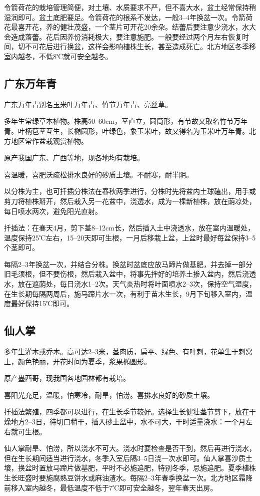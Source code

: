 \documentclass{ctexbook}
\begin{document}
令箭荷花的栽培管理简便，对土壤、水质要求不严，但不喜大水，盆土经常保持稍湿润即可。盆土底肥要足。令箭荷花的根系不发达，一般3--4年换盆一次。令箭荷花最喜开花，养的健壮茂盛，一个茎片可开花20余朵。结蕾后要注意少浇水，水大会造成落蕾。花后因养份消耗极大，要注意施肥。一般要经过两个月左右恢复时间，切不可花后进行换盆，这样会影响植株生长，甚至造成死亡。北方地区冬季移室内越冬，不低8℃就可安全越冬。
\subsection{广东万年青}
广东万年青别名玉米叶万年青、竹节万年青、亮丝草。

多年生常绿草本植物。株高50--60cm，茎直立，圆筒形，有节故又取名竹节万年青。叶柄苞茎互生，长椭圆形，叶绿色，象玉米叶，故又得名为玉米叶万年青。北方地区常作盆栽观赏植物。

原产我国广东、广西等地，现各地均有栽培。

喜温暖，喜肥沃疏松排水良好的砂质土壤。不耐寒，耐半阴。

以分株为主，也可扦插分株法在春秋两季进行，分株时先将盆内土球磕出，用手或剪刀将植株掰开，然后栽入另一花盆中，浇透水，成为一棵新植株，放在荫凉处，每日喷水两次，避免阳光直射。

扦插法：在春天4月，剪下茎8--12cm长，然后插入土中浇透水，放在室内温暖处，温度保持25℃左右，15--20天即可生根，一月后移栽上盆，上盆时最好每盆保持3--5个茎即可。

每隔2--3年换盆一次，并结合分株。换盆时盆底应放马蹄片做基肥，并去掉一部分旧毛须根，但不要伤根，然后栽入盆中，将事先拌好的培养土掺入盆内，然后浇透水，放在遮荫处，每日浇水1--2次。天气炎热时将叶面喷水2--3次，保持空气湿度，在生长期每隔两周后，施马蹄片水一次，有利于苗木生长，9月下旬移入室内，温度最好保持15℃即可。
\subsection{仙人掌}
多年生灌木或乔木。高可达2--3米，茎肉质，扁平、绿色、有叶刺，花单生于刺窝上，颜色艳丽，开花时间为夏季，浆果椭圆形。

原产墨西哥，现我国各地园林都有栽培。

喜阳光充足，温暖，怕寒冷，耐旱，怕涝。喜排水良好的砂质土壤。

扦插法繁殖，四季都可以进行，在生长季节较好。选择生长健壮茎节剪下，放在干燥地方2--3日，待切口稍干，插入砂土盆中，水不可大，干时适量浇水：一个月左右就可生根。

仙人掌耐旱、怕涝，所以浇水不可大。浇水时要检查是否干到，然后再进行浇水，但在生长期间适当进行浇水，冬季入室后隔3--5日浇一次水即可。仙人掌喜沙质土壤，换盆时置放马蹄片做基肥，平时不必施追肥，特别冬季，忌施追肥。夏季植株生长旺盛时要施腐熟豆饼水或麻油渣水。每隔2--3年春季换盆一次。北方地区霜降前移入室内越冬，最低温度不低于7℃即可安全越冬，翌年春天出房。
\end{document}
